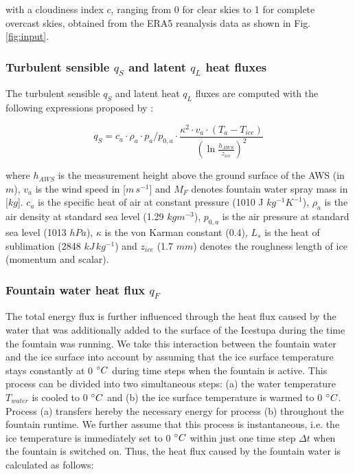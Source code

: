 \documentclass[utf8]{frontiersSCNS} %
\begin{document}
with a cloudiness index $c$, ranging from 0 for clear skies to 1 for complete overcast skies, obtained from the ERA5
reanalysis data as shown in Fig.  \ref{fig:input}.

\subsubsection{Turbulent sensible $q_{S}$ and latent $q_{L}$ heat fluxes }

The turbulent sensible $q_{S}$ and latent heat $q_{L}$ fluxes are computed with the following expressions proposed by
\cite{Garratt_1992}:

\begin{equation} q_{S}=c_{a} \cdot \rho_{a} \cdot p_{a}/p_{0,a} \cdot \frac{\kappa^2 \cdot v_a \cdot
(T_a-T_{ice})}{{(\ln{\frac{h_{AWS}}{z_{ice}}})}^2} \label{eqn:qs} \end{equation}

where $h_{AWS}$ is the measurement height above the ground surface of the AWS (in $m$), $v_a$ is the wind speed in
[$m\,s^{-1}$] and $M_{F}$ denotes fountain water spray mass in [$kg$]. $c_a$ is the specific heat of air at constant
pressure (1010 J $kg^{-1} K^{-1}$), $\rho_{a}$ is the air density at standard sea level (1.29 $kg m^{-3}$), $p_{0,a}$ is
the air pressure at standard sea level (1013 $hPa$), $\kappa$ is the von Karman constant (0.4), $L_s$ is the heat of
sublimation (2848 $kJ\, kg^{-1}$) and $z_{ice}$ (1.7 $mm$) denotes the roughness length of ice (momentum and scalar).


\subsubsection{Fountain water heat flux $q_{F}$ }

The total energy flux is further influenced through the heat flux caused by the water that was additionally added to the
surface of the Icestupa during the time the fountain was running. We take this interaction between the fountain water
and the ice surface into account by assuming that the ice surface temperature stays constantly at 0 $\degree C$ during
time steps when the fountain is active. This process can be divided into two simultaneous steps: (a) the water
temperature $T_{water}$ is cooled to 0 $\degree C$ and (b) the ice surface temperature is warmed to 0 $\degree C$.
Process (a) transfers hereby the necessary energy for process (b) throughout the fountain runtime. We further assume
that this process is instantaneous, i.e. the ice temperature is immediately set to 0 $\degree C$ within just one time
step $\Delta t$ when the fountain is switched on. Thus, the heat flux caused by the fountain water is calculated as
follows:
\end{document}
